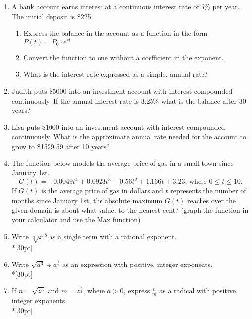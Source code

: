 \documentclass[12pt, oneside]{article}
\begin{document}
\begin{enumerate}

\item A bank account earns interest at a continuous interest rate of 5\% per year. The initial deposit is \$225.
\begin{enumerate}
    \item Express the balance in the account as a function in the form $P(t)=P_0 \cdot e^{rt}$\\[30pt]
    \item Convert the function to one without a coefficient in the exponent. \\[30pt]
    \item What is the interest rate expressed as a simple, annual rate?\\[30pt]
\end{enumerate}

\item Judith puts \$5000 into an investment account with interest compounded continuously. If the annual interest rate is 3.25\% what is the balance after 30 years?\\[60pt]

\item Lisa puts \$1000 into an investment account with interest compounded continuously. What is the approximate annual rate needed for the account to grow to \$1529.59 after 10 years?\\[60pt]


\item The function below models the average price of gas in a small town since January 1st.
\[G(t)=-0.0049t^4 + 0.0923t^3 - 0.56t^2 +1.166t+3.23 \text{, where } 0 \leq t \leq 10.\]
If $G(t)$ is the average price of gas in dollars and $t$ represents the number of months since January 1st, the absolute maximum $G(t)$ reaches over the given domain is about what value, to the nearest cent? (graph the function in your calculator and use the Max function)%

\newpage


\item Write $\sqrt[3]x^8$ as a single term with a rational exponent.\\*[30pt]

\item Write $\sqrt{a^3} \div a^{\frac{1}{2}}$ as an expression with positive, integer exponents.\\*[30pt]

\item If $n=\sqrt{z^5}$ and $m=z^{\frac{7}{2}}$, where $a > 0$, express $\frac{n}{m}$ as a radical with positive, integer exponents. \\*[30pt]


\end{enumerate}
\end{document}

